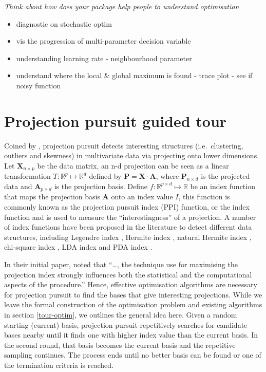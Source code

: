 \documentclass[12pt]{article}
\providecommand{\tightlist}{%
  \setlength{\itemsep}{0pt}\setlength{\parskip}{0pt}}
\begin{document}
\emph{Think about how does your package help people to understand
optimisation}

\begin{itemize}
\tightlist
\item
  diagnostic on stochastic optim
\item
  vis the progression of multi-parameter decision variable
\item
  understanding learning rate - neighbourhood parameter
\item
  understand where the local \& global maximum is found - trace plot -
  see if noisy function
\end{itemize}

\newpage

\hypertarget{tour}{%
\section{Projection pursuit guided tour}\label{tour}}

Coined by \citet{friedman1974projection}, projection pursuit detects
interesting structures (i.e.~clustering, outliers and skewness) in
multivariate data via projecting onto lower dimensions. Let
\(\mathbf{X}_{n \times p}\) be the data matrix, an n-d projection can be
seen as a linear transformation \(T: \mathbb{R}^p \mapsto \mathbb{R}^d\)
defined by \(\mathbf{P} = \mathbf{X} \cdot \mathbf{A}\), where
\(\mathbf{P}_{n \times d}\) is the projected data and
\(\mathbf{A}_{p\times d}\) is the projection basis. Define
\(f: \mathbb{R}^{p \times d} \mapsto \mathbb{R}\) be an index function
that maps the projection basis \(\mathbf{A}\) onto an index value \(I\),
this function is commonly known as the projection pursuit index (PPI)
function, or the index function and is used to measure the
``interestingness'' of a projection. A number of index functions have
been proposed in the literature to detect different data structures,
including Legendre index \citep{friedman1974projection}, Hermite index
\citep{hall1989polynomial}, natural Hermite index
\citep{cook1993projection}, chi-square index
\citep{posse1995projection}, LDA index \citep{lee2005projection} and PDA
index \citep{lee2010projection}.

In their initial paper, \citet{friedman1974projection} noted that
``\ldots{}, the technique use for maximising the projection index
strongly influences both the statistical and the computational aspects
of the procedure.'' Hence, effective optimisation algorithms are
necessary for projection pursuit to find the bases that give interesting
projections. While we leave the formal construction of the optimisation
problem and existing algorithms in section \ref{tour-optim}, we outlines
the general idea here. Given a random starting (current) basis,
projection pursuit repetitively searches for candidate bases nearby
until it finds one with higher index value than the current basis. In
the second round, that basis becomes the current basis and the
repetitive sampling continues. The process ends until no better basis
can be found or one of the termination criteria is reached.
\end{document}
